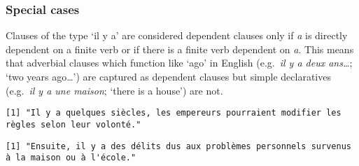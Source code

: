 \documentclass[
]{article}
\newenvironment{Shaded}{\begin{snugshade}}{\end{snugshade}}
\newcommand{\CommentTok}[1]{\textcolor[rgb]{0.56,0.35,0.01}{\textit{#1}}}
\newcommand{\DataTypeTok}[1]{\textcolor[rgb]{0.13,0.29,0.53}{#1}}
\newcommand{\KeywordTok}[1]{\textcolor[rgb]{0.13,0.29,0.53}{\textbf{#1}}}
\newcommand{\NormalTok}[1]{#1}
\newcommand{\OtherTok}[1]{\textcolor[rgb]{0.56,0.35,0.01}{#1}}
\newcommand{\StringTok}[1]{\textcolor[rgb]{0.31,0.60,0.02}{#1}}
\begin{document}
\hypertarget{special-cases}{%
\subsubsection{Special cases}\label{special-cases}}

Clauses of the type `il y a' are considered dependent clauses only if
\emph{a} is directly dependent on a finite verb or if there is a finite
verb dependent on \emph{a}. This means that adverbial clauses which
function like `ago' in English (e.g.~\emph{il y a deux ans\ldots{}};
`two years ago\ldots{}') are captured as dependent clauses but simple
declaratives (e.g.~\emph{il y a une maison}; `there is a house') are
not.

\begin{verbatim}
[1] "Il y a quelques siècles, les empereurs pourraient modifier les règles selon leur volonté."
\end{verbatim}

\begin{Shaded}
\end{Shaded}

\begin{verbatim}
[1] "Ensuite, il y a des délits dus aux problèmes personnels survenus à la maison ou à l'école."
\end{verbatim}

\begin{Shaded}
\end{Shaded}
\end{document}
